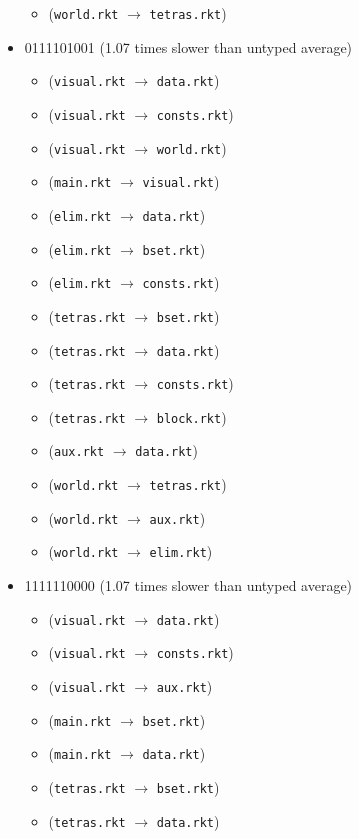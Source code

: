 \documentclass{article}
\newcommand{\mono}[1]{\texttt{#1}}
\begin{document}
\begin{itemize}
\begin{itemize}
  \item (\mono{world.rkt} $\rightarrow$ \mono{tetras.rkt})
  \end{itemize}
\item 0111101001 (1.07 times slower than untyped average)
  \begin{itemize}
  \item (\mono{visual.rkt} $\rightarrow$ \mono{data.rkt})
  \item (\mono{visual.rkt} $\rightarrow$ \mono{consts.rkt})
  \item (\mono{visual.rkt} $\rightarrow$ \mono{world.rkt})
  \item (\mono{main.rkt} $\rightarrow$ \mono{visual.rkt})
  \item (\mono{elim.rkt} $\rightarrow$ \mono{data.rkt})
  \item (\mono{elim.rkt} $\rightarrow$ \mono{bset.rkt})
  \item (\mono{elim.rkt} $\rightarrow$ \mono{consts.rkt})
  \item (\mono{tetras.rkt} $\rightarrow$ \mono{bset.rkt})
  \item (\mono{tetras.rkt} $\rightarrow$ \mono{data.rkt})
  \item (\mono{tetras.rkt} $\rightarrow$ \mono{consts.rkt})
  \item (\mono{tetras.rkt} $\rightarrow$ \mono{block.rkt})
  \item (\mono{aux.rkt} $\rightarrow$ \mono{data.rkt})
  \item (\mono{world.rkt} $\rightarrow$ \mono{tetras.rkt})
  \item (\mono{world.rkt} $\rightarrow$ \mono{aux.rkt})
  \item (\mono{world.rkt} $\rightarrow$ \mono{elim.rkt})
  \end{itemize}
\item 1111110000 (1.07 times slower than untyped average)
  \begin{itemize}
  \item (\mono{visual.rkt} $\rightarrow$ \mono{data.rkt})
  \item (\mono{visual.rkt} $\rightarrow$ \mono{consts.rkt})
  \item (\mono{visual.rkt} $\rightarrow$ \mono{aux.rkt})
  \item (\mono{main.rkt} $\rightarrow$ \mono{bset.rkt})
  \item (\mono{main.rkt} $\rightarrow$ \mono{data.rkt})
  \item (\mono{tetras.rkt} $\rightarrow$ \mono{bset.rkt})
  \item (\mono{tetras.rkt} $\rightarrow$ \mono{data.rkt})

\end{itemize}
\end{itemize}
\end{document}
